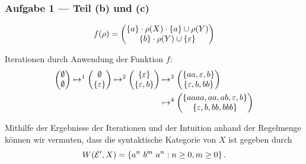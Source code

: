 \documentclass{beamer}
\begin{document}
\begin{frame} \frametitle{Aufgabe 1 --- Teil (b) und (c)}
	\begin{equation*}
		f(\rho) = \begin{pmatrix} 
		\left\{ a \right\} \cdot \rho(X) \cdot \left\{ a \right\} \cup \rho(Y) \\ 
		\left\{ b \right\} \cdot \rho(Y) \cup \left\{ \varepsilon \right\}
		\end{pmatrix}
	\end{equation*}
	
	Iterationen durch Anwendung der Funktion $f$:
	\begin{align*}
		\begin{pmatrix} \emptyset \\ \emptyset \end{pmatrix}
		\mapsto^1
		\begin{pmatrix} \emptyset \\ \left\{ \varepsilon \right\} \end{pmatrix}
		\mapsto^2
		\begin{pmatrix} \left\{ \varepsilon \right\} \\ \left\{ \varepsilon, b \right\} \end{pmatrix}
		&\mapsto^3
		\begin{pmatrix} \left\{ aa, \varepsilon, b \right\} \\ \left\{ \varepsilon, b, bb \right\} \end{pmatrix} \\
		&\mapsto^4
		\begin{pmatrix} \left\{ aaaa, aa, ab, \varepsilon, b \right\} \\ \left\{ \varepsilon, b, bb, bbb \right\} \end{pmatrix} 
	\end{align*}
	
	\pause
	Mithilfe der Ergebnisse der Iterationen und der Intuition anhand der Regelmenge können wir vermuten, dass die syntaktische Kategorie von $X$ ist gegeben durch
	\begin{equation*}
	W(\mathcal{E}', X) = \left\{ a^n \ b^m \ a^n : n \ge 0, m \ge 0 \right\}.
	\end{equation*}
\end{frame}
\end{document}
